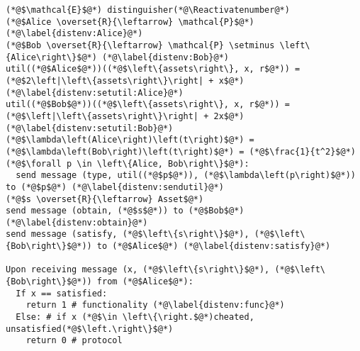 \Suppressnumber
\begin{lstlisting}[label=distenv, style=numbers]
(*@$\mathcal{E}$@*) distinguisher(*@\Reactivatenumber@*)
(*@$Alice \overset{R}{\leftarrow} \mathcal{P}$@*) (*@\label{distenv:Alice}@*)
(*@$Bob \overset{R}{\leftarrow} \mathcal{P} \setminus \left\{Alice\right\}$@*) (*@\label{distenv:Bob}@*)
util((*@$Alice$@*))((*@$\left\{assets\right\}, x, r$@*)) = (*@$2\left|\left\{assets\right\}\right| + x$@*) (*@\label{distenv:setutil:Alice}@*)
util((*@$Bob$@*))((*@$\left\{assets\right\}, x, r$@*)) = (*@$\left|\left\{assets\right\}\right| + 2x$@*) (*@\label{distenv:setutil:Bob}@*)
(*@$\lambda\left(Alice\right)\left(t\right)$@*) = (*@$\lambda\left(Bob\right)\left(t\right)$@*) = (*@$\frac{1}{t^2}$@*)
(*@$\forall p \in \left\{Alice, Bob\right\}$@*):
  send message (type, util((*@$p$@*)), (*@$\lambda\left(p\right)$@*)) to (*@$p$@*) (*@\label{distenv:sendutil}@*)
(*@$s \overset{R}{\leftarrow} Asset$@*)
send message (obtain, (*@$s$@*)) to (*@$Bob$@*) (*@\label{distenv:obtain}@*)
send message (satisfy, (*@$\left\{s\right\}$@*), (*@$\left\{Bob\right\}$@*)) to (*@$Alice$@*) (*@\label{distenv:satisfy}@*)

Upon receiving message (x, (*@$\left\{s\right\}$@*), (*@$\left\{Bob\right\}$@*)) from (*@$Alice$@*):
  If x == satisfied:
    return 1 # functionality (*@\label{distenv:func}@*)
  Else: # if x (*@$\in \left\{\right.$@*)cheated, unsatisfied(*@$\left.\right\}$@*)
    return 0 # protocol
\end{lstlisting}
